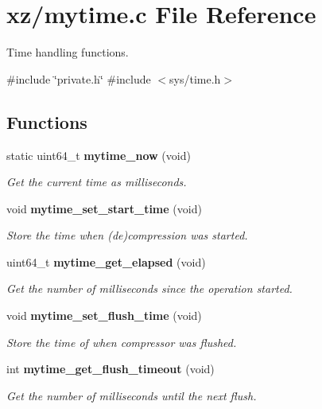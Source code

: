 \section{xz/mytime.c File Reference}
\label{mytime_8c}


Time handling functions.  


{\ttfamily \#include \char`\"{}private.\+h\char`\"{}}\newline
{\ttfamily \#include $<$sys/time.\+h$>$}\newline
\subsection*{Functions}
\begin{DoxyCompactItemize}
\item 
static uint64\+\_\+t \textbf{ mytime\+\_\+now} (void)
\begin{DoxyCompactList}\small\item\em Get the current time as milliseconds. \end{DoxyCompactList}\item 
void \textbf{ mytime\+\_\+set\+\_\+start\+\_\+time} (void)
\begin{DoxyCompactList}\small\item\em Store the time when (de)compression was started. \end{DoxyCompactList}\item 
uint64\+\_\+t \textbf{ mytime\+\_\+get\+\_\+elapsed} (void)
\begin{DoxyCompactList}\small\item\em Get the number of milliseconds since the operation started. \end{DoxyCompactList}\item 
void \textbf{ mytime\+\_\+set\+\_\+flush\+\_\+time} (void)
\begin{DoxyCompactList}\small\item\em Store the time of when compressor was flushed. \end{DoxyCompactList}\item 
int \textbf{ mytime\+\_\+get\+\_\+flush\+\_\+timeout} (void)
\begin{DoxyCompactList}\small\item\em Get the number of milliseconds until the next flush. \end{DoxyCompactList}\end{DoxyCompactItemize}
